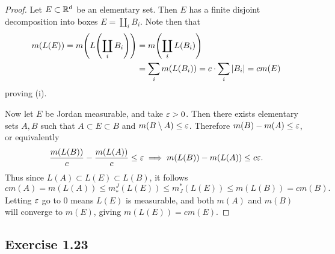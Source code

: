 \documentclass[hw_all.tex]{subfiles}
\begin{document}
\begin{proof}
    Let $E \subset \mathbb{R}^d$ be an elementary set. Then $E$ has a finite disjoint decomposition into boxes $E = \coprod_i B_i$. Note then that
    \begin{align*}
        m(L(E)) = m\qty(L\qty(\coprod_i B_i)) &= m\qty(\coprod_i L(B_i))  \\
        &= \sum_i m(L(B_i)) = c \cdot \sum_i |B_i| = c m(E)
    \end{align*}
    proving (i).

    Now let $E$ be Jordan measurable, and take $\varepsilon > 0$. Then there exists elementary sets $A, B$ such that $A \subset E \subset B$ and $m(B \setminus A) \leq \varepsilon$. Therefore $m(B) - m(A) \leq \varepsilon$, or equivalently
    \[
        \frac{m(L(B))}{c} - \frac{m(L(A))}{c} \leq \varepsilon \implies m(L(B)) - m(L(A)) \leq c \varepsilon
    .\]
    Thus since $L(A) \subset L(E) \subset L(B)$, it follows
    \[
        c m(A) = m(L(A)) \leq m^J_*(L(E)) \leq m_J^*(L(E)) \leq m(L(B)) = c m(B)
    .\]
    Letting $\varepsilon$ go to $0$ means $L(E)$ is measurable, and both $m(A)$ and $m(B)$ will converge to $m(E)$, giving $m(L(E)) = c m(E)$.

\end{proof}

\subsection{Exercise 1.23}
\end{document}
